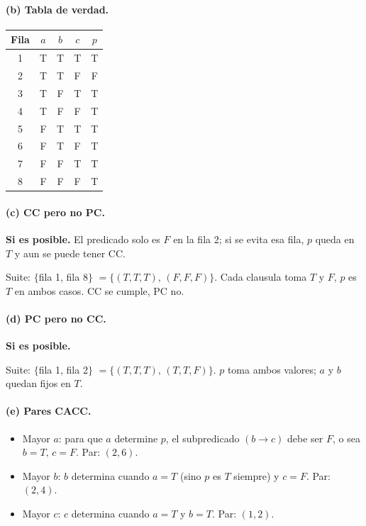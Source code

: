 \documentclass[12pt,a4paper]{article}
\begin{document}
\paragraph{(b) Tabla de verdad.}

\begin{center}
\begin{tabular}{ccccc}
\toprule
Fila & $a$ & $b$ & $c$ & $p$ \\
\midrule
1 & T & T & T & T \\
2 & T & T & F & F \\
3 & T & F & T & T \\
4 & T & F & F & T \\
5 & F & T & T & T \\
6 & F & T & F & T \\
7 & F & F & T & T \\
8 & F & F & F & T \\
\bottomrule
\end{tabular}
\end{center}

\paragraph{(c) CC pero no PC.} \textbf{Si es posible.} El predicado solo es $F$ en la fila 2; si
se evita esa fila, $p$ queda en $T$ y aun se puede tener CC.

Suite: $\{$fila 1, fila 8$\}$ $=\{(T,T,T),\,(F,F,F)\}$. Cada clausula toma $T$ y $F$, $p$ es $T$
en ambos casos. CC se cumple, PC no.

\paragraph{(d) PC pero no CC.} \textbf{Si es posible.}

Suite: $\{$fila 1, fila 2$\}$ $=\{(T,T,T),\,(T,T,F)\}$. $p$ toma ambos valores; $a$ y $b$ quedan
fijos en $T$.

\paragraph{(e) Pares CACC.}

\begin{itemize}
  \item Mayor $a$: para que $a$ determine $p$, el subpredicado $(b\rightarrow c)$ debe ser $F$,
  o sea $b=T,\, c=F$. Par: $(2,6)$.
  \item Mayor $b$: $b$ determina cuando $a=T$ (sino $p$ es $T$ siempre) y $c=F$. Par: $(2,4)$.
  \item Mayor $c$: $c$ determina cuando $a=T$ y $b=T$. Par: $(1,2)$.
\end{itemize}
\end{document}
